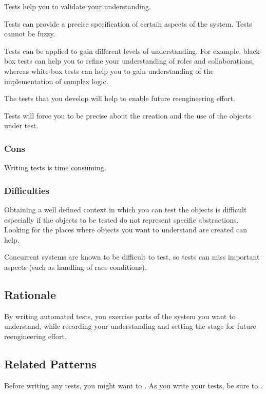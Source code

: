 \documentclass[a4paper,10pt,twoside]{book}
\begin{document}
\begin{bulletlist}
\item Tests help you to validate your understanding.
\item Tests can provide a precise specification of certain aspects of the system. Tests cannot be fuzzy.
\item Tests can be applied to gain different levels of understanding. For example, black-box tests can help you to refine your understanding of roles and collaborations, whereas white-box tests can help you to gain understanding of the implementation of complex logic.
\item The tests that you develop will help to enable future reengineering effort.
\item Tests will force you to be precise about the creation and the use of the objects under test.
\end{bulletlist}

\subsubsection*{Cons}

\begin{bulletlist}
\item Writing tests is time consuming.
\end{bulletlist}

\subsubsection*{Difficulties}

\begin{bulletlist}
\item Obtaining a well defined context in which you can test the objects is difficult especially if the objects to be tested do not represent specific abstractions. Looking for the places where objects you want to understand are created can help. 
\item Concurrent systems are known to be difficult to test, so tests can miss important aspects (such as handling of race conditions).
\end{bulletlist}

\subsection*{Rationale}

By writing automated tests, you exercise parts of the system you want to understand, while recording your understanding and setting the stage for future reengineering effort.

\subsection*{Related Patterns}

Before writing any tests, you might want to . As you write your tests, be sure to .

\ifx\wholebook\relax\else
   
   
   
\end{document}
